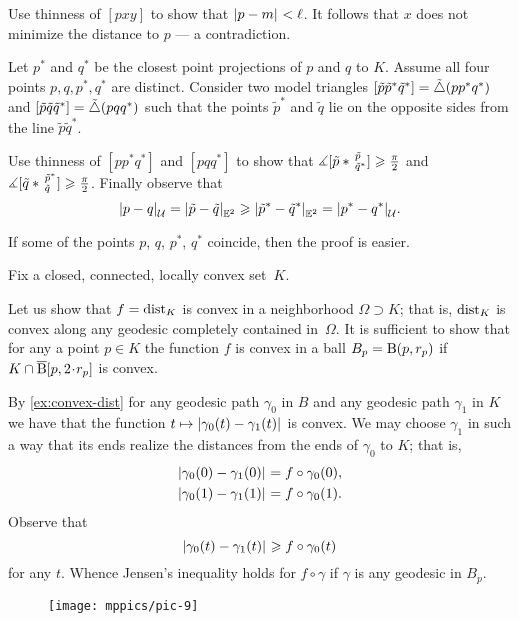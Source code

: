 Use thinness of $[pxy]$ to show that $\dist{p}{m}{}<\ell$.
It follows that $x$ does not minimize the distance to $p$ --- a contradiction.

Let $p^*$ and $q^*$ be the closest point projections of $p$ and $q$ to $K$.
Assume all four points $p,q,p^*,q^*$ are distinct.
Consider two model triangles $[\tilde p\tilde p^*\tilde q^*]=\tilde\triangle(pp^*q^*)$ and $[\tilde p\tilde q\tilde q^*]=\tilde\triangle(pqq^*)$ 
such that the points $\tilde p^*$ and $\tilde q$ lie on the opposite sides from the line $\tilde p\tilde q^*$.

Use thinness of $[pp^*q^*]$ and $[pqq^*]$ to show that $\measuredangle[\tilde p*\,{}^{\tilde p}_{\tilde q^*}]\geqslant \tfrac\pi2$ and $\measuredangle[\tilde q*\,{}^{\tilde p^*}_{\tilde q}]\geqslant \tfrac\pi2$.
Finally observe that 
\[\dist{p}{q}{\spc{U}}=\dist{\tilde p}{\tilde q}{\EE^2}\ge \dist{\tilde p^*}{\tilde q^*}{\EE^2}=\dist{p^*}{q^*}{\spc{U}}.\]

If some of the points $p$, $q$, $p^*$, $q^*$ coincide, then the proof is easier.

 Fix a closed, connected, locally convex set~$K$.

Let us show that $f=\mathrm{dist}_K$ is convex in a neighborhood $\Omega\supset K$; that is, $\mathrm{dist}_K$ is convex along any geodesic completely contained in~$\Omega$.
It is sufficient to show that for any a point $p\in K$ the function $f$ is convex in a ball $B_p= \mathrm{B}{}(p, r_p)$ if $K\cap \cBall[p,2\cdot r_p]$ is convex.

By \ref{ex:convex-dist} for any geodesic path $\gamma_0$ in $B$ and any geodesic path $\gamma_1$ in $K$ we have that the function 
$t\mapsto\dist{\gamma_0(t)}{\gamma_1(t)}{}$ is convex.
We may choose $\gamma_1$ in such a way that its ends realize the distances from the ends of $\gamma_0$ to $K$;
that is,
\begin{align*}
\dist{\gamma_0(0)}{\gamma_1(0)}{}&=f\circ\gamma_0(0),
\\
\dist{\gamma_0(1)}{\gamma_1(1)}{}&=f\circ\gamma_0(1).
\end{align*}
Observe that 
\[\dist{\gamma_0(t)}{\gamma_1(t)}{}\ge f\circ\gamma_0(t)\]
for any $t$.
Whence Jensen's inequality holds for $f\circ\gamma$ if $\gamma$ is any geodesic in $B_p$.

\begin{wrapfigure}{o}{45 mm}
\vskip-4mm
\centering
\texttt{[image: mppics/pic-9]}
\end{wrapfigure}

